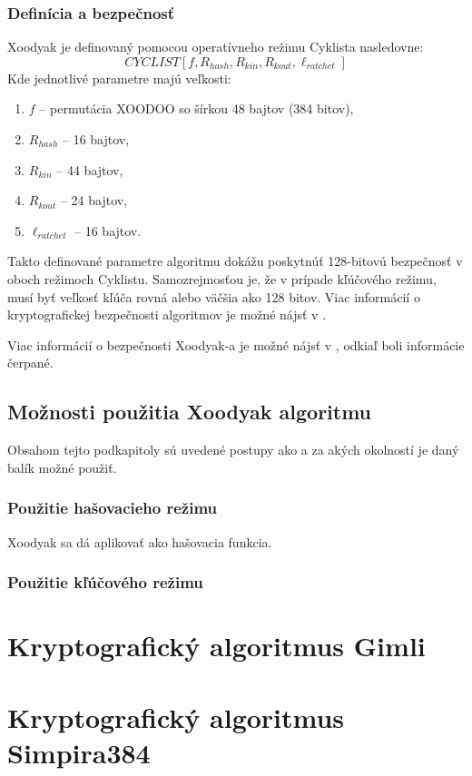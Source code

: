 \subsubsection{Definícia a bezpečnosť}
Xoodyak je definovaný pomocou operatívneho režimu Cyklista nasledovne:
\begin{equation}
	CYCLIST[f,R_{hash},R_{kin},R_{kout},\ell_{ratchet}]
\end{equation} 
Kde jednotlivé parametre majú veľkosti:
\begin{enumerate}
	\item $f$ -- permutácia XOODOO so šírkou 48 bajtov (384 bitov),
	\item $R_{hash}$ -- 16 bajtov,
	\item $R_{kin}$ -- 44 bajtov,
	\item $R_{kout}$ -- 24 bajtov,
	\item $\ell_{ratchet}$ -- 16 bajtov.  
\end{enumerate}
Takto definované parametre algoritmu dokážu poskytnúť 128-bitovú bezpečnosť v oboch režimoch Cyklistu. Samozrejmosťou je, že v prípade kľúčového režimu, musí byť veľkosť kľúča rovná alebo väčšia ako 128 bitov. Viac informácií o kryptografickej bezpečnosti algoritmov je možné nájsť v \cite{sec}.

Viac informácií o bezpečnosti Xoodyak-a je možné nájsť v \cite{xcb, 7.3}, odkiaľ boli informácie čerpané.

\subsection{Možnosti použitia Xoodyak algoritmu}
Obsahom tejto podkapitoly sú uvedené postupy ako a za akých okolností je daný balík možné použiť. 
\subsubsection{Použitie hašovacieho režimu}
Xoodyak sa dá aplikovať ako hašovacia funkcia.
\subsubsection{Použitie kľúčového režimu}
\section{Kryptografický algoritmus Gimli} 
\section{Kryptografický algoritmus Simpira384} 
